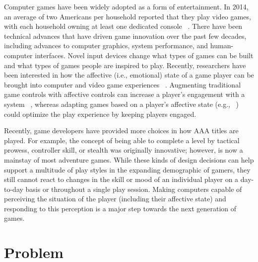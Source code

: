 
Computer games have been widely adopted as a form of entertainment. In 2014, an average of two Americans per household reported that they play video games, with each household owning at least one dedicated console ~\cite{entertainment2014essential}. There have been technical advances that have driven game innovation over the past few decades, including advances to computer graphics, system performance, and human-computer interfaces. Novel input devices change what types of games can be built and what types of games people are inspired to play. Recently, researchers have been interested in how the affective (i.e., emotional) state of a game player can be brought into computer and video game experiences ~\cite{gilleade2005affective}. Augmenting traditional game controls with affective controls can increase a player's engagement with a system ~\cite{nacke2011biofeedback}, whereas adapting games based on a player's affective state (e.g., ~\cite{dekker2007please, epp2011identifying}) could optimize the play experience by keeping players engaged.

Recently, game developers have provided more choices in how AAA titles are played. For example, the concept of being able to complete a level by tactical prowess, controller skill, or stealth was originally innovative; however, is now a mainstay of most adventure games. While these kinds of design decisions can help support a multitude of play styles in the expanding demographic of gamers, they still cannot react to changes in the skill or mood of an individual player on a day-to-day basis or throughout a single play session. Making computers capable of perceiving the situation of the player (including their affective state) and responding to this perception is a major step towards the next generation of games.

\section{Problem}

